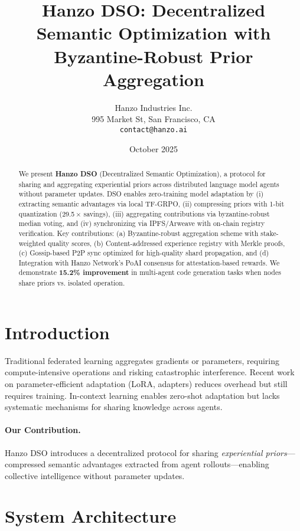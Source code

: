 \documentclass[11pt]{article}
\title{Hanzo DSO: Decentralized Semantic Optimization with Byzantine-Robust Prior Aggregation}
\author{Hanzo Industries Inc. \\ 995 Market St, San Francisco, CA \\ \texttt{contact@hanzo.ai}}
\date{October 2025}
\begin{document}
\maketitle

\begin{abstract}
We present \textbf{Hanzo DSO} (Decentralized Semantic Optimization), a protocol for sharing and aggregating experiential priors across distributed language model agents without parameter updates. DSO enables zero-training model adaptation by (i) extracting semantic advantages via local TF-GRPO, (ii) compressing priors with 1-bit quantization (29.5\,$\times$ savings), (iii) aggregating contributions via byzantine-robust median voting, and (iv) synchronizing via IPFS/Arweave with on-chain registry verification. Key contributions: (a) Byzantine-robust aggregation scheme with stake-weighted quality scores, (b) Content-addressed experience registry with Merkle proofs, (c) Gossip-based P2P sync optimized for high-quality shard propagation, and (d) Integration with Hanzo Network's PoAI consensus for attestation-based rewards. We demonstrate \textbf{15.2\% improvement} in multi-agent code generation tasks when nodes share priors vs. isolated operation.
\end{abstract}

\section{Introduction}
Traditional federated learning aggregates gradients or parameters, requiring compute-intensive operations and risking catastrophic interference. Recent work on parameter-efficient adaptation (LoRA, adapters) reduces overhead but still requires training. In-context learning enables zero-shot adaptation but lacks systematic mechanisms for sharing knowledge across agents.

\paragraph{Our Contribution.} Hanzo DSO introduces a decentralized protocol for sharing \emph{experiential priors}---compressed semantic advantages extracted from agent rollouts---enabling collective intelligence without parameter updates.

\section{System Architecture}
\end{document}
